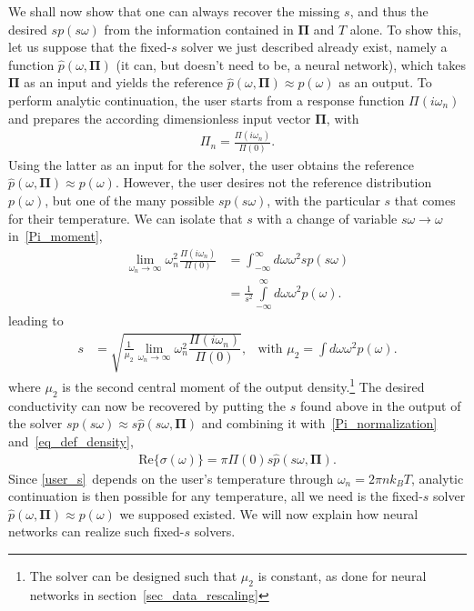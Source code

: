\documentclass[notitlepage, 11pt, nofootinbib]{revtex4-1}
\renewcommand{\vec}[1]{\bm{#1}}
\begin{document}
We shall now show that one can always recover the missing $s$, and thus the desired $sp(s\omega)$ from the information contained in $\vec\Pi$ and $T$ alone.
To show this, let us suppose that the fixed-$s$ solver we just described already exist, namely a function $\hat{p}(\omega, \vec \Pi)$ (it can, but doesn't need to be, a neural network), which takes $\vec \Pi$ as an input and yields the reference $\hat{p}(\omega, \vec \Pi) \approx p(\omega)$ as an output. To perform analytic continuation, the user starts from a response function $\Pi(i\omega_n)$ and prepares the according dimensionless input vector $\vec \Pi$, with
\begin{align}
\Pi_n = \frac{\Pi(i\omega_n)}{\Pi(0)}.
\end{align}
Using the latter as an input for the solver, the user obtains the reference $\hat{p}(\omega, \vec \Pi)\approx p(\omega)$. However, the user desires not the reference distribution $p(\omega)$, but one of the many possible $sp(s\omega)$, with the particular $s$ that comes for their temperature.
We can isolate that $s$ with a change of variable $s\omega\rightarrow \omega$ in~\eqref{Pi_moment},
\begin{align}
\lim_{\omega_n\rightarrow\infty}\omega_n^2
\frac{\Pi(i\omega_n)}{\Pi(0)}
&=
\int_{-\infty}^{\infty}d\omega \omega^2 sp(s\omega)
\\
&=
\frac{1}{s^2}
\int\limits_{-\infty}^{\infty}d\omega \omega^2 p(\omega).
\end{align}
leading to 
\begin{align}
s
&=
\sqrt{
\frac{1}{\mu_2}
\lim\limits_{\omega_n\rightarrow\infty}\omega_n^2
\dfrac{\Pi(i\omega_n)}{\Pi(0)}
},
&\text{with }
\mu_2
=
\int d\omega \omega^2 p(\omega).
\label{user_s}
\end{align}
where $\mu_2$ is the second central moment of the output density.\footnote{The solver can be designed such that $\mu_2$ is constant, as done for neural networks in section~\ref{sec_data_rescaling}}
The desired conductivity can now be recovered by putting the $s$ found above in the output of the solver $sp(s\omega) \approx s\hat{p}(s\omega, \vec \Pi)$ and combining it with~\eqref{Pi_normalization} and~\eqref{eq_def_density},
\begin{align}
\text{Re}\{ \sigma(\omega) \} = \pi\Pi(0) 
s \hat{p}(s\omega, \vec \Pi).
\end{align}
Since \eqref{user_s}~depends on the user's temperature through $\omega_n = 2\pi n k_B T$, analytic continuation is then possible for any temperature, all we need is the fixed-$s$ solver $\hat{p}(\omega, \vec \Pi)\approx p(\omega)$ we supposed existed. We will now explain how neural networks can realize such fixed-$s$ solvers.
\end{document}
